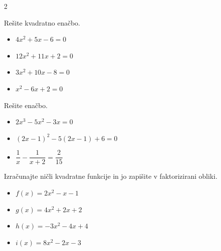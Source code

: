             \begin{multicols}{2}
            \begin{naloga}
                Rešite kvadratno enačbo.
                
                    \begin{itemize}
                        \item $ 4x^2+5x-6=0 $ 
                        \item $ 12x^2+11x+2=0 $ 
                        \item $ 3x^2+10x-8=0 $ 
                        \item $ x^2-6x+2=0 $
                    \end{itemize}

            \end{naloga}

            \begin{naloga}
                Rešite enačbo.
                
                    \begin{itemize}
                        \item $ 2x^3-5x^2-3x=0 $ 
                        \item $ \left(2x-1\right)^2-5\left(2x-1\right)+6=0 $ 
                        \item $ \dfrac{1}{x}-\dfrac{1}{x+2}=\dfrac{2}{15} $ 
                    \end{itemize}

            \end{naloga}


            \end{multicols}


    

        \begin{naloga}
                Izračunajte ničli kvadratne funkcije in jo zapišite v faktorizirani obliki.
                
                    \begin{itemize}
                        \item $ f(x)=2x^2-x-1 $ 
                        \item $ g(x)=4x^2+2x+2 $ 
                        \item $ h(x)=-3x^2-4x+4 $ 
                        \item $ i(x)=8x^2-2x-3 $ 
                    \end{itemize}

            \end{naloga}


